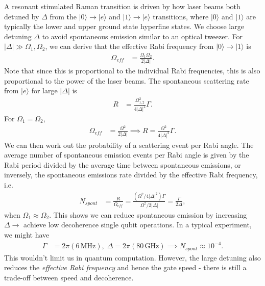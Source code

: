 \documentclass[a4paper, 11pt, normalem]{report}
\begin{document}
A resonant stimulated Raman transition is driven by how laser beams both detuned by $\Delta$ from the $|0\rangle\to|e\rangle$ and $|1\rangle\to|e\rangle$ transitions, where $|0\rangle$ and $|1\rangle$ are typically the lower and upper ground state hyperfine states.
We choose large detuning $\Delta$ to avoid spontaneous emission similar to an optical tweezer.
For $|\Delta|\gg\Omega_1,\Omega_2$, we can derive that the effective Rabi frequency from $|0\rangle\to|1\rangle$ is
\begin{align}
    \Omega_{eff} &= \frac{\Omega_1\Omega_2}{2|\Delta|}.
\end{align}
Note that since this is proportional to the individual Rabi frequencies, this is also proportional to the power of the laser beams.
The spontaneous scattering rate from $|e\rangle$ for large $|\Delta|$ is
\begin{align}
    R &= \frac{\Omega_{1,2}^2}{4|\Delta|^2}\Gamma.
\end{align}
For $\Omega_1=\Omega_2$,
\begin{align}
    \Omega_{eff} &= \frac{\Omega^2}{2|\Delta|} \implies R = \frac{\Omega^2}{4|\Delta|^2}\Gamma.
\end{align}
We can then work out the probability of a scattering event per Rabi angle.
The average number of spontaneous emission events per Rabi angle is given by the Rabi period divided by the average time between spontaneous emissions, or inversely, the spontaneous emissions rate divided by the effective Rabi frequency, i.e.
\begin{align}
    N_{spont} &= \frac{R}{\Omega_{eff}} = \frac{(\Omega^2/4|\Delta|^2)\Gamma}{\Omega^2/2|\Delta|} = \frac{\Gamma}{2\Delta},
\end{align}
when $\Omega_1\approx\Omega_2$.
This shows we can reduce spontaneous emission by increasing $\Delta\to$ achieve low decoherence single qubit operations.
In a typical experiment, we might have
\begin{align}
    \Gamma &= 2\pi(6\,\text{MHz}),\; \Delta = 2\pi(80\,\text{GHz}) \implies N_{spont}\approx10^{-4}.
\end{align}
This wouldn't limit us in quantum computation.
However, the large detuning also reduces the \emph{effective Rabi frequency} and hence the gate speed - there is still a trade-off between speed and decoherence.
\end{document}
